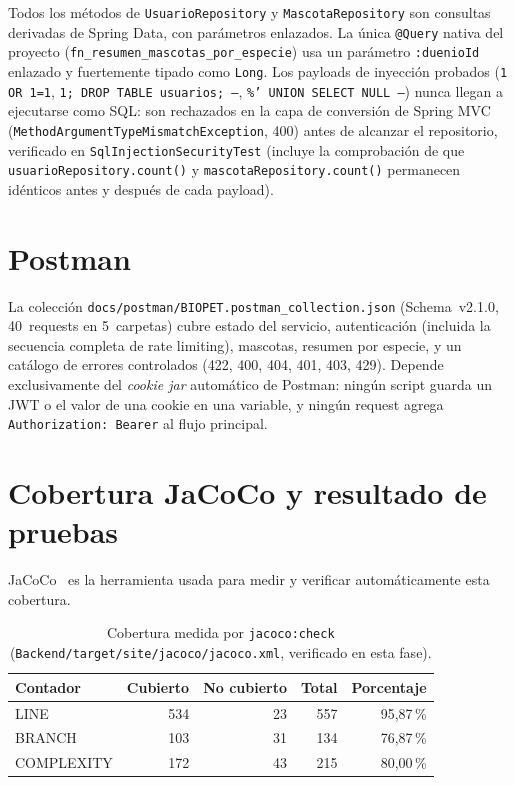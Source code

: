 Todos los m\'etodos de \texttt{UsuarioRepository} y \texttt{MascotaRepository}
son consultas derivadas de Spring Data, con par\'ametros enlazados. La
\'unica \texttt{@Query} nativa del proyecto
(\texttt{fn\_resumen\_mascotas\_por\_especie}) usa un par\'ametro
\texttt{:duenioId} enlazado y fuertemente tipado como \texttt{Long}. Los
payloads de inyecci\'on probados (\texttt{1 OR 1=1},
\texttt{1; DROP TABLE usuarios; --}, \texttt{\%' UNION SELECT NULL --})
nunca llegan a ejecutarse como SQL: son rechazados en la capa de conversi\'on
de Spring MVC (\texttt{MethodArgumentTypeMismatchException}, 400) antes de
alcanzar el repositorio, verificado en
\texttt{SqlInjectionSecurityTest} (incluye la comprobaci\'on de que
\texttt{usuarioRepository.count()} y \texttt{mascotaRepository.count()}
permanecen id\'enticos antes y despu\'es de cada payload).

\section{Postman}

La colecci\'on \texttt{docs/postman/BIOPET.postman\_collection.json}
(Schema~v2.1.0, 40~requests en 5~carpetas) cubre estado del servicio,
autenticaci\'on (incluida la secuencia completa de rate limiting),
mascotas, resumen por especie, y un cat\'alogo de errores controlados
(422, 400, 404, 401, 403, 429). Depende exclusivamente del \emph{cookie
jar} autom\'atico de Postman: ning\'un script guarda un JWT o el valor de
una cookie en una variable, y ning\'un request agrega
\texttt{Authorization: Bearer} al flujo principal.

\section{Cobertura JaCoCo y resultado de pruebas}

JaCoCo~\cite{jacoco-docs} es la herramienta usada para medir y verificar
autom\'aticamente esta cobertura.

\begin{table}[H]
  \centering
  \caption{Cobertura medida por \texttt{jacoco:check} (\texttt{Backend/target/site/jacoco/jacoco.xml}, verificado en esta fase).}
  \label{tab:jacoco-jaime}
  \begin{tabular}{@{}lrrrr@{}}
    \toprule
    Contador & Cubierto & No cubierto & Total & Porcentaje \\
    \midrule
    LINE & 534 & 23 & 557 & 95{,}87\,\% \\
    BRANCH & 103 & 31 & 134 & 76{,}87\,\% \\
    COMPLEXITY & 172 & 43 & 215 & 80{,}00\,\% \\
    \bottomrule
  \end{tabular}
\end{table}

